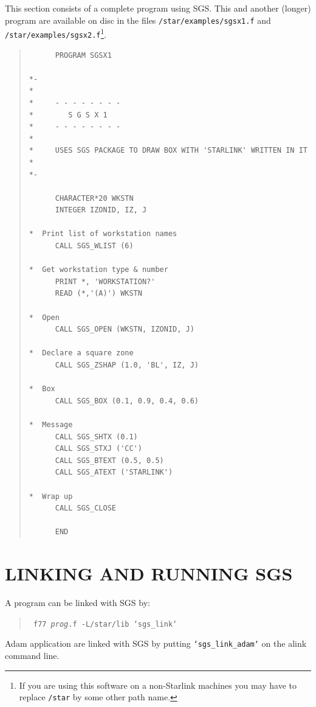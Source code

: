 \documentclass[11pt]{article}
\begin{document}
This section consists of a complete program using SGS.  This
and another (longer) program are available on disc in the
files {\tt /star/examples/sgsx1.f} and 
{\tt /star/examples/sgsx2.f}\footnote{If you are using this 
software on a non-Starlink machines you may have to replace {\tt /star} by some
other path name.}. 
\begin{quote}
\begin{verbatim}
      PROGRAM SGSX1

*-
*
*     - - - - - - - -
*        S G S X 1
*     - - - - - - - -
*
*     USES SGS PACKAGE TO DRAW BOX WITH 'STARLINK' WRITTEN IN IT
*
*-

      CHARACTER*20 WKSTN
      INTEGER IZONID, IZ, J 

*  Print list of workstation names
      CALL SGS_WLIST (6)

*  Get workstation type & number
      PRINT *, 'WORKSTATION?'
      READ (*,'(A)') WKSTN

*  Open
      CALL SGS_OPEN (WKSTN, IZONID, J)

*  Declare a square zone
      CALL SGS_ZSHAP (1.0, 'BL', IZ, J)

*  Box
      CALL SGS_BOX (0.1, 0.9, 0.4, 0.6)

*  Message
      CALL SGS_SHTX (0.1)
      CALL SGS_STXJ ('CC')
      CALL SGS_BTEXT (0.5, 0.5)
      CALL SGS_ATEXT ('STARLINK')

*  Wrap up
      CALL SGS_CLOSE

      END
\end{verbatim}
\end{quote}          

\appendix
\section {LINKING AND RUNNING SGS}\label{app-linking}

A program can be linked with SGS by:
\begin{quote}\tt
    f77 {\em{prog}}.f -L/star/lib `sgs\_link`
\end{quote}
Adam application are linked with SGS by putting {\tt `sgs\_link\_adam`} on
the alink command line.
\end{document}
